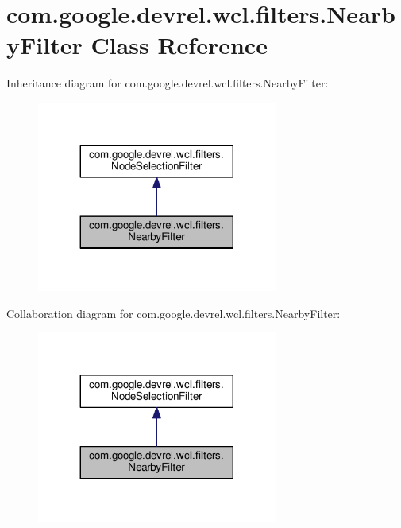 \hypertarget{classcom_1_1google_1_1devrel_1_1wcl_1_1filters_1_1NearbyFilter}{}\section{com.\+google.\+devrel.\+wcl.\+filters.\+Nearby\+Filter Class Reference}
\label{classcom_1_1google_1_1devrel_1_1wcl_1_1filters_1_1NearbyFilter}


Inheritance diagram for com.\+google.\+devrel.\+wcl.\+filters.\+Nearby\+Filter\+:\nopagebreak
\begin{figure}[H]
\begin{center}
\leavevmode
\includegraphics[width=224pt]{d1/d6d/classcom_1_1google_1_1devrel_1_1wcl_1_1filters_1_1NearbyFilter__inherit__graph}
\end{center}
\end{figure}


Collaboration diagram for com.\+google.\+devrel.\+wcl.\+filters.\+Nearby\+Filter\+:\nopagebreak
\begin{figure}[H]
\begin{center}
\leavevmode
\includegraphics[width=224pt]{d4/d03/classcom_1_1google_1_1devrel_1_1wcl_1_1filters_1_1NearbyFilter__coll__graph}
\end{center}
\end{figure}
